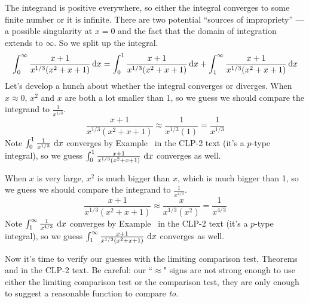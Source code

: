 \begin{solution}
The integrand is positive everywhere, so either the integral
converges to some finite number or it is infinite. There are two potential
``sources of impropriety'' --- a possible singularity at $x=0$ and
the fact that the domain of integration extends to $\infty$.
So we split up the integral.
\begin{align*}
\int_0^\infty\frac{x+1}{x^{1/3}(x^2+x+1)}\,\mathrm{d}x
= \int_0^1\frac{x+1}{x^{1/3}(x^2+x+1)}\,\mathrm{d}x
  +\int_1^\infty\frac{x+1}{x^{1/3}(x^2+x+1)}\,\mathrm{d}x
\end{align*}
Let's develop a hunch about whether the integral converges or diverges. When $x\approx 0$,  $x^2$ and $x$ are both a lot smaller than 1, so we guess we should compare the integrand to $\frac{1}{x^{1/3}}$.
\begin{equation*}
\frac{x+1}{x^{1/3}(x^2+x+1)} \approx \frac{1}{x^{1/3}(1)} =
                                      \frac{1}{x^{1/3}}
\end{equation*}
Note $\int_0^1 \frac{1}{x^{1/3}}~\mathrm{d}x$ converges by Example~
 in the CLP-2 text (it's a $p$-type integral), so we guess $\int_0^1 \frac{x+1}{x^{1/3}(x^2+x+1)}~\mathrm{d}x$ converges as well.

When $x$ is very large, $x^2$ is much bigger than $x$, which is much bigger than 1, so we guess we should compare the integrand to $\frac{1}{x^{4/3}}$.
\begin{equation*}
\frac{x+1}{x^{1/3}(x^2+x+1)} \approx \frac{x}{x^{1/3}(x^2)} =
                                      \frac{1}{x^{4/3}}
\end{equation*}
Note $\int_1^\infty \frac{1}{x^{4/3}}~\mathrm{d}x$ converges by Example~ in the CLP-2 text (it's a $p$-type integral), so we guess $\int_1^\infty \frac{x+1}{x^{1/3}(x^2+x+1)}~\mathrm{d}x$ converges as well.

Now it's time to verify our guesses with the limiting comparison test, Theorems~ and  in the CLP-2 text. Be careful:
our ``$\approx$" signs are not strong enough to use either the limiting comparison test or the comparison test, they are only enough to suggest a reasonable function to compare \emph{to}.


\end{solution}
